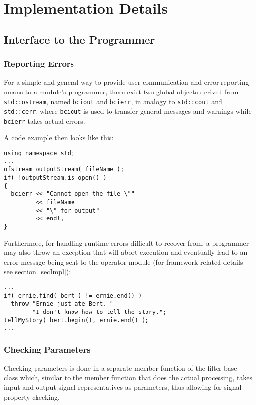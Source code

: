 \documentclass[12pt,letterpaper]{article}
\begin{document}
\pagebreak
\section{Implementation Details}

\subsection{Interface to the Programmer}

\subsubsection{Reporting Errors}

For a simple and general way to provide
user communication and error reporting means to a module's
programmer, there exist two global
objects derived from \texttt{std::ostream}, named
\texttt{bciout} and \texttt{bcierr}, in analogy to
\texttt{std::cout} and \texttt{std::cerr}, where \texttt{bciout}
is used to transfer general messages and warnings while
\texttt{bcierr} takes actual errors.

A code example then looks like this:
\begin{verbatim}
using namespace std;
...
ofstream outputStream( fileName );
if( !outputStream.is_open() )
{
  bcierr << "Cannot open the file \""
         << fileName
         << "\" for output"
         << endl;
}
\end{verbatim}

Furthermore, for handling runtime errors difficult to recover
from, a programmer may also throw an exception that will abort
execution and
eventually lead to an error message being sent to the operator
module (for framework related details see section~\ref{secImpl}):
\begin{verbatim}
...
if( ernie.find( bert ) != ernie.end() )
  throw "Ernie just ate Bert. " 
        "I don't know how to tell the story.";
tellMyStory( bert.begin(), ernie.end() );
...
\end{verbatim}

\subsubsection{Checking Parameters}

Checking parameters is done in a separate member function
of the filter base class which, similar to the member function
that does the actual processing, takes input and output signal
representatives as parameters, thus allowing for signal
property checking.
\end{document}
